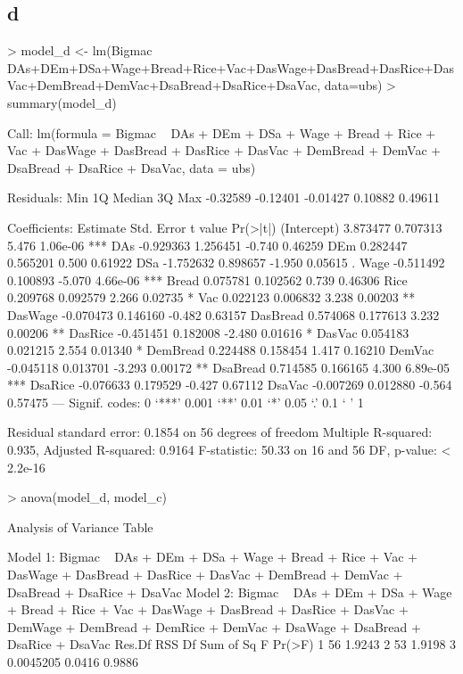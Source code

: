 \documentclass{article}
\begin{document}
\subsection*{d}
\begin{Schunk}
\begin{Sinput}
> model_d <- lm(Bigmac ~ DAs+DEm+DSa+Wage+Bread+Rice+Vac+DasWage+DasBread+DasRice+DasVac+DemBread+DemVac+DsaBread+DsaRice+DsaVac, data=ubs)
> summary(model_d)
\end{Sinput}
\begin{Soutput}
Call:
lm(formula = Bigmac ~ DAs + DEm + DSa + Wage + Bread + Rice + 
    Vac + DasWage + DasBread + DasRice + DasVac + DemBread + 
    DemVac + DsaBread + DsaRice + DsaVac, data = ubs)

Residuals:
     Min       1Q   Median       3Q      Max 
-0.32589 -0.12401 -0.01427  0.10882  0.49611 

Coefficients:
             Estimate Std. Error t value Pr(>|t|)    
(Intercept)  3.873477   0.707313   5.476 1.06e-06 ***
DAs         -0.929363   1.256451  -0.740  0.46259    
DEm          0.282447   0.565201   0.500  0.61922    
DSa         -1.752632   0.898657  -1.950  0.05615 .  
Wage        -0.511492   0.100893  -5.070 4.66e-06 ***
Bread        0.075781   0.102562   0.739  0.46306    
Rice         0.209768   0.092579   2.266  0.02735 *  
Vac          0.022123   0.006832   3.238  0.00203 ** 
DasWage     -0.070473   0.146160  -0.482  0.63157    
DasBread     0.574068   0.177613   3.232  0.00206 ** 
DasRice     -0.451451   0.182008  -2.480  0.01616 *  
DasVac       0.054183   0.021215   2.554  0.01340 *  
DemBread     0.224488   0.158454   1.417  0.16210    
DemVac      -0.045118   0.013701  -3.293  0.00172 ** 
DsaBread     0.714585   0.166165   4.300 6.89e-05 ***
DsaRice     -0.076633   0.179529  -0.427  0.67112    
DsaVac      -0.007269   0.012880  -0.564  0.57475    
---
Signif. codes:  0 ‘***’ 0.001 ‘**’ 0.01 ‘*’ 0.05 ‘.’ 0.1 ‘ ’ 1

Residual standard error: 0.1854 on 56 degrees of freedom
Multiple R-squared:  0.935,	Adjusted R-squared:  0.9164 
F-statistic: 50.33 on 16 and 56 DF,  p-value: < 2.2e-16
\end{Soutput}
\begin{Sinput}
> anova(model_d, model_c)
\end{Sinput}
\begin{Soutput}
Analysis of Variance Table

Model 1: Bigmac ~ DAs + DEm + DSa + Wage + Bread + Rice + Vac + DasWage + 
    DasBread + DasRice + DasVac + DemBread + DemVac + DsaBread + 
    DsaRice + DsaVac
Model 2: Bigmac ~ DAs + DEm + DSa + Wage + Bread + Rice + Vac + DasWage + 
    DasBread + DasRice + DasVac + DemWage + DemBread + DemRice + 
    DemVac + DsaWage + DsaBread + DsaRice + DsaVac
  Res.Df    RSS Df Sum of Sq      F Pr(>F)
1     56 1.9243                           
2     53 1.9198  3 0.0045205 0.0416 0.9886
\end{Soutput}
\end{Schunk}
\end{document}
